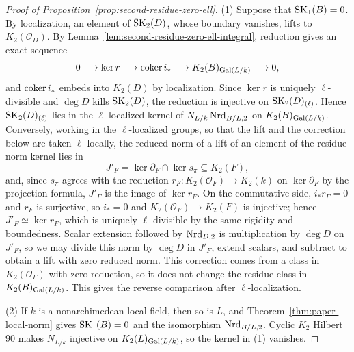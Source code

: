 \begin{proof}[Proof of Proposition~\ref{prop:second-residue-zero-ell}]
(1) Suppose that $\operatorname{SK}_1(B)=0$.
By localization, an element of $\operatorname{SK}_2(D)$, whose boundary vanishes, lifts to $K_2(\mathcal O_D)$.
By Lemma~\ref{lem:second-residue-zero-ell-integral}, reduction gives an exact sequence
\[
 0\longrightarrow\ker r\longrightarrow\operatorname{coker} i_*\longrightarrow K_2(B)_{\operatorname{Gal}(L/k)}\longrightarrow0,
\]
and $\operatorname{coker} i_*$ embeds into $K_2(D)$ by localization.
Since $\ker r$ is uniquely $\ell$-divisible and $\deg D$ kills $\operatorname{SK}_2(D)$, the reduction is injective on $\operatorname{SK}_2(D)_{(\ell)}$.
Hence $\operatorname{SK}_2(D)_{(\ell)}$ lies in the $\ell$-localized kernel of $N_{L/k}\operatorname{Nrd}_{B/L,2}$ on $K_2(B)_{\operatorname{Gal}(L/k)}$.
Conversely, working in the $\ell$-localized groups, so that the lift and the correction below are taken $\ell$-locally, the reduced norm of a lift of an element of the residue norm kernel lies in
\[
 J'_F=\ker\partial_F\cap\ker s_\pi\subseteq K_2(F),
\]
and, since $s_\pi$ agrees with the reduction $r_F\colon K_2(\mathcal O_F)\to K_2(k)$ on $\ker\partial_F$ by the projection formula, $J'_F$ is the image of $\ker r_F$.
On the commutative side, $i_*r_F=0$ and $r_F$ is surjective, so $i_*=0$ and $K_2(\mathcal O_F)\to K_2(F)$ is injective; hence $J'_F\simeq\ker r_F$, which is uniquely $\ell$-divisible by the same rigidity and boundedness.
Scalar extension followed by $\operatorname{Nrd}_{D,2}$ is multiplication by $\deg D$ on $J'_F$, so we may divide this norm by $\deg D$ in $J'_F$, extend scalars, and subtract to obtain a lift with zero reduced norm.
This correction comes from a class in $K_2(\mathcal O_F)$ with zero reduction, so it does not change the residue class in $K_2(B)_{\operatorname{Gal}(L/k)}$.
This gives the reverse comparison after $\ell$-localization.

(2) If $k$ is a nonarchimedean local field, then so is $L$, and Theorem~\ref{thm:paper-local-norm} gives $\operatorname{SK}_1(B)=0$ and the isomorphism $\operatorname{Nrd}_{B/L,2}$.
Cyclic $K_2$ Hilbert 90 \cite[Theorem 14.1]{MerkurjevSuslin1982} makes $N_{L/k}$ injective on $K_2(L)_{\operatorname{Gal}(L/k)}$, so the kernel in (1) vanishes.
\end{proof}
